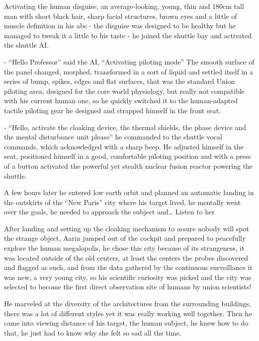 \documentclass[hidelinks,12pt,a4paper]{book}
\begin{document}
Activating the human \gls{disguise}, an average-looking, young, thin and 180cm tall man with short black hair, 
sharp facial structures, brown eyes and a little of muscle definition in his abs - the disguise was designed to be healthy but he managed to tweak it a little to his taste -
 he joined the shuttle bay and activated the shuttle AI.\par
 \bigskip

- “Hello Professor” said the AI, “Activating piloting mode”\newline
The smooth surface of the panel changed, morphed, transformed in a sort of liquid and settled itself 
in a series of bump, spikes, edges and flat surfaces, that was the standard Union piloting area, 
designed for the core world physiology, but really not compatible with his current human one, so he 
quickly switched it to the human-adapted tactile piloting gear he designed and strapped himself in the front seat.\par
\bigskip

- “Hello, activate the cloaking device, the thermal shields, the phase device and the mental disturbance unit please” 
he commanded to the shuttle vocal commands, 
which acknowledged with a sharp beep. 
He adjusted himself in the seat, positioned himself in a good, comfortable piloting position and with a press 
of a button activated the powerful yet stealth nuclear fusion reactor powering the shuttle.\par
\bigskip

A few hours later he entered low earth orbit and planned an automatic landing in the outskirts of the 
“New Paris” city where his target lived, he mentally went over the goals, he needed to approach the 
subject and… Listen to her\par
\bigskip

After landing and setting up the cloaking mechanism to assure nobody will spot the strange object, 
Aarin jumped out of the cockpit and prepared to peacefully explore the human megalopolis, 
he chose this city because of its strangeness, it was located outside of the old centers, 
at least the centers the probes discovered and flagged as such, and from the data gathered by the continuous 
surveillance it was new, a very young city, so his scientific curiosity was picked and the city was selected to 
become the first direct observation site of humans by union scientists!\par
\bigskip

He marveled at the diversity of the architectures from the surrounding buildings, 
there was a lot of different styles yet it was really working well together. Then he came into viewing distance of his target,
 the human subject, he knew how to do that, he just had to know why she felt so sad all the time. \par
 \bigskip
\end{document}
